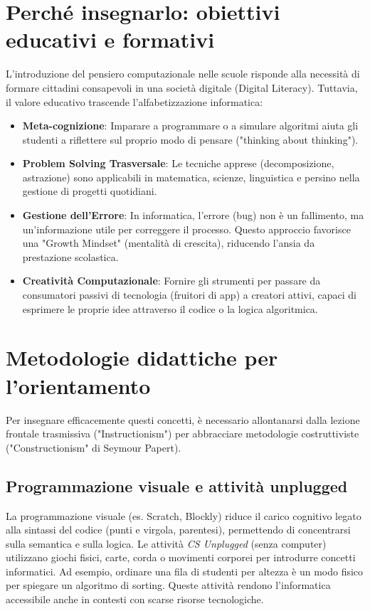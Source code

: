 \documentclass[openany]{theme/uniprthesis}
\begin{document}
\section{Perché insegnarlo: obiettivi educativi e formativi}
L'introduzione del pensiero computazionale nelle scuole risponde alla necessità di formare cittadini consapevoli in una società digitale (Digital Literacy). 
Tuttavia, il valore educativo trascende l'alfabetizzazione informatica:
\begin{itemize}
    \item \textbf{Meta-cognizione}: Imparare a programmare o a simulare algoritmi aiuta gli studenti a riflettere sul proprio modo di pensare ("thinking about thinking").
    \item \textbf{Problem Solving Trasversale}: Le tecniche apprese (decomposizione, astrazione) sono applicabili in matematica, scienze, linguistica e persino nella gestione di progetti quotidiani.
    \item \textbf{Gestione dell'Errore}: In informatica, l'errore (bug) non è un fallimento, ma un'informazione utile per correggere il processo. Questo approccio favorisce una "Growth Mindset" (mentalità di crescita), riducendo l'ansia da prestazione scolastica.
    \item \textbf{Creatività Computazionale}: Fornire gli strumenti per passare da consumatori passivi di tecnologia (fruitori di app) a creatori attivi, capaci di esprimere le proprie idee attraverso il codice o la logica algoritmica.
\end{itemize}

\section{Metodologie didattiche per l'orientamento}
Per insegnare efficacemente questi concetti, è necessario allontanarsi dalla lezione frontale trasmissiva ("Instructionism") per abbracciare metodologie costruttiviste ("Constructionism" di Seymour Papert).

\subsection{Programmazione visuale e attività unplugged}
La programmazione visuale (es. Scratch, Blockly) riduce il carico cognitivo legato alla sintassi del codice (punti e virgola, parentesi), permettendo di concentrarsi sulla semantica e sulla logica. 
Le attività \textit{CS Unplugged} (senza computer) utilizzano giochi fisici, carte, corda o movimenti corporei per introdurre concetti informatici. Ad esempio, ordinare una fila di studenti per altezza è un modo fisico per spiegare un algoritmo di sorting. Queste attività rendono l'informatica accessibile anche in contesti con scarse risorse tecnologiche.
\end{document}
